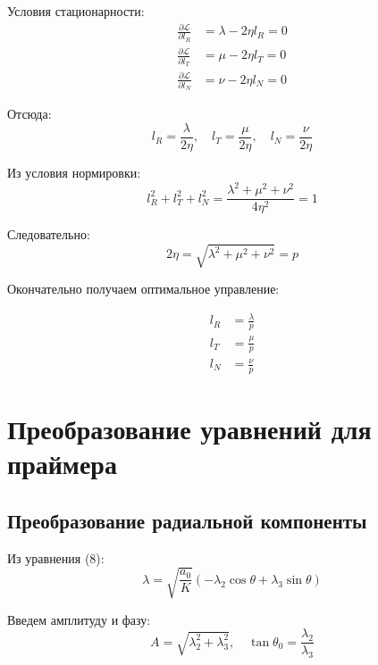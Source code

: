 \documentclass[12pt]{article}
\begin{document}
Условия стационарности:
\begin{align}
\frac{\partial \mathcal{L}}{\partial l_R} &= \lambda - 2\eta l_R = 0 \\
\frac{\partial \mathcal{L}}{\partial l_T} &= \mu - 2\eta l_T = 0 \\
\frac{\partial \mathcal{L}}{\partial l_N} &= \nu - 2\eta l_N = 0
\end{align}

Отсюда:
\begin{equation}
l_R = \frac{\lambda}{2\eta}, \quad l_T = \frac{\mu}{2\eta}, \quad l_N = \frac{\nu}{2\eta}
\end{equation}

Из условия нормировки:
\begin{equation}
l_R^2 + l_T^2 + l_N^2 = \frac{\lambda^2 + \mu^2 + \nu^2}{4\eta^2} = 1
\end{equation}

Следовательно:
\begin{equation}
2\eta = \sqrt{\lambda^2 + \mu^2 + \nu^2} = p
\end{equation}

Окончательно получаем оптимальное управление:

\begin{align}
l_R &= \frac{\lambda}{p} \tag{7} \\
l_T &= \frac{\mu}{p} \tag{7} \\
l_N &= \frac{\nu}{p} \tag{7}
\end{align}

\section{Преобразование уравнений для праймера}

\subsection{Преобразование радиальной компоненты}

Из уравнения (8):
\begin{equation}
\lambda = \sqrt{\frac{a_0}{K}} (-\lambda_2 \cos \theta + \lambda_3 \sin \theta)
\end{equation}

Введем амплитуду и фазу:
\begin{equation}
A = \sqrt{\lambda_2^2 + \lambda_3^2}, \quad \tan \theta_0 = \frac{\lambda_2}{\lambda_3} \tag{14}
\end{equation}
\end{document}
